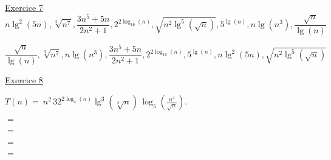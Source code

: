 \documentclass[11pt]{article}
\begin{document}
\bigskip


\underline{Exercice 7} 
$$   n \lg^2(5n), \sqrt[3]{n^7}, \frac{3n^5+5n}{2n^2+1},2^{2 \log_{16}(n)} , \sqrt{n^2 \lg^5\left(\sqrt{n}\right)}, 5^{\lg(n)},n \lg(n^3),\frac{\sqrt{n}}{\lg(n)}$$

$$\frac{\sqrt{n}}{\lg(n)}, \sqrt[3]{n^7}, n \lg(n^3), \frac{3n^5+5n}{2n^2+1}, 2^{2 \log_{16}(n)}, 5^{\lg(n)}, n \lg^2(5n), \sqrt{n^2 \lg^5\left(\sqrt{n}\right)}$$

\bigskip


\underline{Exercice 8} 

$T(n)=\ n^2\, 32^{ 2\log_4(n)} \lg^3\left(\sqrt[3]{n}\right) \, \log_5\left(\frac{n^4}{\sqrt{n}} \right) $. 

$=$

$= $

$= $

$=$
\end{document}
